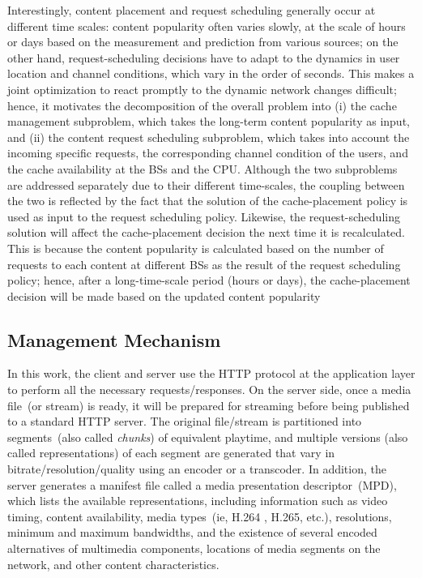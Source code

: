 Interestingly, content placement and request scheduling generally occur at different time scales: content popularity often varies slowly, at the scale of hours or days based on the measurement and prediction from various sources; on the other hand, request-scheduling decisions have to adapt to the dynamics in user location and channel conditions, which vary in the order of seconds. This makes a joint optimization to react promptly to the dynamic network changes difficult; hence, it motivates the decomposition of the overall problem into (i) the cache management subproblem, which takes the long-term content popularity as input, and (ii) the content request scheduling subproblem, which takes into account the incoming specific requests, the corresponding channel condition of the users, and the cache availability at the BSs and the CPU. Although the two subproblems are addressed separately due to their different time-scales, the coupling between the two is reflected by the fact that the solution of the cache-placement policy is used as input to the request scheduling policy. Likewise, the request-scheduling solution will affect the cache-placement decision the next time it is recalculated. This is because the content popularity is calculated based on the number of requests to each content at different BSs as the result of the request scheduling policy; hence, after a long-time-scale period (hours or days), the cache-placement decision will be made based on the updated content popularity

\subsection{Management Mechanism}

In this work, the client and server use the HTTP protocol at the application layer to perform all the necessary requests/responses. On the server side, once a media file~(or stream) is ready, it will be prepared for streaming before being published to a standard HTTP server. The original file/stream is partitioned into segments~(also called \textit{chunks}) of equivalent playtime, and multiple versions (also called representations) of each segment are generated that vary in bitrate/resolution/quality using an encoder or a transcoder.
In addition, the server generates a manifest file called a media presentation descriptor~(MPD), which lists the available representations, including information such as video timing, content availability, media types~(ie, H.264 , H.265, etc.), resolutions, minimum and maximum bandwidths, and the existence of several encoded alternatives of multimedia components, locations of media segments on the network, and other content characteristics.

